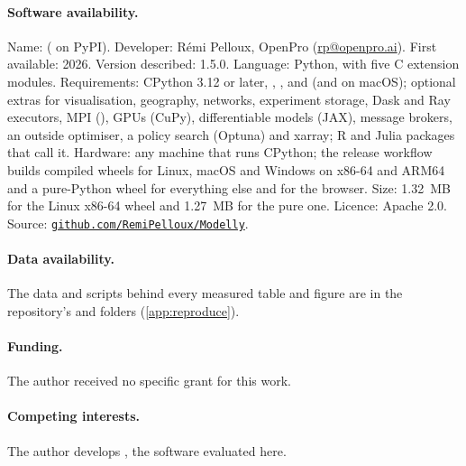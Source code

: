 \paragraph{Software availability.} Name: \modelly{} ( on PyPI). Developer:
R\'emi Pelloux, OpenPro (\href{mailto:rp@openpro.ai}{rp@openpro.ai}). First available: 2026.
Version described: 1.5.0. Language: Python, with five C extension modules. Requirements:
CPython 3.12 or later, , ,  and  (and
 on macOS); optional extras for visualisation, geography, networks, experiment
storage, Dask and Ray executors, MPI (), GPUs (CuPy), differentiable models (JAX),
message brokers, an outside optimiser, a policy search (Optuna) and xarray; R and Julia
packages that call it.
Hardware: any machine that runs CPython; the release workflow builds compiled wheels for
Linux, macOS and Windows on x86-64 and ARM64 and a pure-Python wheel for everything else and
for the browser. Size: 1.32~MB for the
Linux x86-64 wheel and 1.27~MB for the pure one. Licence: Apache 2.0. Source:
\href{https://github.com/RemiPelloux/Modelly}{\nolinkurl{github.com/RemiPelloux/Modelly}}.

\paragraph{Data availability.} The data and scripts behind every measured table and figure are
in the repository's  and  folders (\cref{app:reproduce}).

\paragraph{Funding.} The author received no specific grant for this work.

\paragraph{Competing interests.} The author develops \modelly{}, the software evaluated here.
